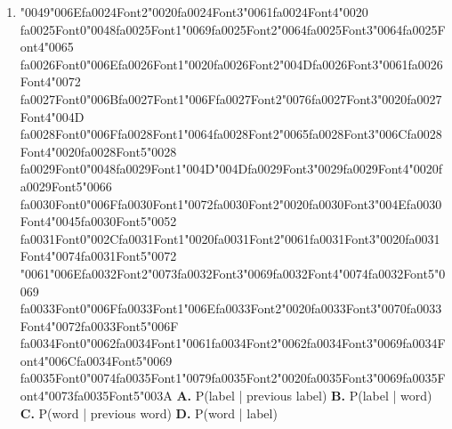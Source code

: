 \documentclass[11pt]{article}
\begin{document}
\begin{enumerate}[leftmargin=*]
    \textbf{A.} It uses only words (observations) and ignores labels
    \textbf{B.} It is identical to an HMM
    \textbf{C.} It models transitions between labels but does not consider the words
    \textbf{D.} It models emissions P(word | label)

  \item {\char"0049}{\char"006E}{\csname fa0024Font2\endcsname\char"0020}{\csname fa0024Font3\endcsname\char"0061}{\csname fa0024Font4\endcsname\char"0020} {\csname fa0025Font0\endcsname\char"0048}{\csname fa0025Font1\endcsname\char"0069}{\csname fa0025Font2\endcsname\char"0064}{\csname fa0025Font3\endcsname\char"0064}{\csname fa0025Font4\endcsname\char"0065} {\csname fa0026Font0\endcsname\char"006E}{\csname fa0026Font1\endcsname\char"0020}{\csname fa0026Font2\endcsname\char"004D}{\csname fa0026Font3\endcsname\char"0061}{\csname fa0026Font4\endcsname\char"0072} {\csname fa0027Font0\endcsname\char"006B}{\csname fa0027Font1\endcsname\char"006F}{\csname fa0027Font2\endcsname\char"0076}{\csname fa0027Font3\endcsname\char"0020}{\csname fa0027Font4\endcsname\char"004D} {\csname fa0028Font0\endcsname\char"006F}{\csname fa0028Font1\endcsname\char"0064}{\csname fa0028Font2\endcsname\char"0065}{\csname fa0028Font3\endcsname\char"006C}{\csname fa0028Font4\endcsname\char"0020}{\csname fa0028Font5\endcsname\char"0028} {\csname fa0029Font0\endcsname\char"0048}{\csname fa0029Font1\endcsname\char"004D}{\char"004D}{\csname fa0029Font3\endcsname\char"0029}{\csname fa0029Font4\endcsname\char"0020}{\csname fa0029Font5\endcsname\char"0066} {\csname fa0030Font0\endcsname\char"006F}{\csname fa0030Font1\endcsname\char"0072}{\csname fa0030Font2\endcsname\char"0020}{\csname fa0030Font3\endcsname\char"004E}{\csname fa0030Font4\endcsname\char"0045}{\csname fa0030Font5\endcsname\char"0052} {\csname fa0031Font0\endcsname\char"002C}{\csname fa0031Font1\endcsname\char"0020}{\csname fa0031Font2\endcsname\char"0061}{\csname fa0031Font3\endcsname\char"0020}{\csname fa0031Font4\endcsname\char"0074}{\csname fa0031Font5\endcsname\char"0072} {\char"0061}{\char"006E}{\csname fa0032Font2\endcsname\char"0073}{\csname fa0032Font3\endcsname\char"0069}{\csname fa0032Font4\endcsname\char"0074}{\csname fa0032Font5\endcsname\char"0069} {\csname fa0033Font0\endcsname\char"006F}{\csname fa0033Font1\endcsname\char"006E}{\csname fa0033Font2\endcsname\char"0020}{\csname fa0033Font3\endcsname\char"0070}{\csname fa0033Font4\endcsname\char"0072}{\csname fa0033Font5\endcsname\char"006F} {\csname fa0034Font0\endcsname\char"0062}{\csname fa0034Font1\endcsname\char"0061}{\csname fa0034Font2\endcsname\char"0062}{\csname fa0034Font3\endcsname\char"0069}{\csname fa0034Font4\endcsname\char"006C}{\csname fa0034Font5\endcsname\char"0069} {\csname fa0035Font0\endcsname\char"0074}{\csname fa0035Font1\endcsname\char"0079}{\csname fa0035Font2\endcsname\char"0020}{\csname fa0035Font3\endcsname\char"0069}{\csname fa0035Font4\endcsname\char"0073}{\csname fa0035Font5\endcsname\char"003A}
    \textbf{A.} P(label | previous label)
    \textbf{B.} P(label | word)
    \textbf{C.} P(word | previous word)
    \textbf{D.} P(word | label)


\end{enumerate}
\end{document}
